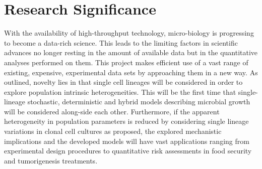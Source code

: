 \documentclass{bioinfo}
\begin{document}
\section{Research Significance}
With the availability of high-throughput technology, micro-biology is progressing to become a data-rich science. This leads to the limiting factors in scientific advances no longer resting in the amount of available data but in the quantitative analyses performed on them. This project makes efficient use of a vast range of existing, expensive, experimental data sets by approaching them in a new way. As outlined, novelty lies in that single cell lineages will be considered in order to explore population intrinsic heterogeneities. This will be the first time that single-lineage stochastic, deterministic and hybrid models describing microbial growth will be considered along-side each other. Furthermore, if the apparent heterogeneity in population parameters is reduced by considering single lineage variations in clonal cell cultures as proposed, the explored mechanistic implications and the developed models will have vast applications ranging from experimental design procedures to quantitative risk assessments in food security and tumorigenesis treatments. 
\end{document}
